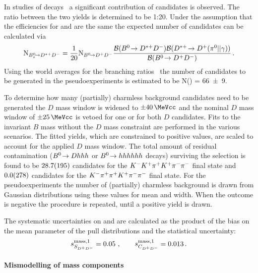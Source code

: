 In studies of \BdToDstD decays~\cite{BToDstDthesis} a significant contribution
of \BsToDstD candidates is observed. The ratio between the two yields is
determined to be 1:20. Under the assumption that the efficiencies for \BToDD
and \BToDstD are the same the expected number of \BsToDstD candidates can be
calculated via
\begin{align}
	\text{N}_{{{B}^0_{s}}\!\rightarrow {\ensuremath{{D}^{*+}}}{\ensuremath{{D}^-}}} = \frac{1}{20} \text{N}_{{{B}^0}\!\rightarrow {\ensuremath{{D}^+}}{\ensuremath{{D}^-}}} \frac{\mathcal{B}({{B}^0}\!\rightarrow {\ensuremath{{D}^{*+}}}{\ensuremath{{D}^-}}) \mathcal{B}({{D}^{*+}} \!\rightarrow {\ensuremath{{D}^+}} ({{\pi}^0} || \gamma))}{\mathcal{B}({{B}^0}\!\rightarrow {\ensuremath{{D}^+}}{\ensuremath{{D}^-}})} \,.
\end{align}
Using the world averages for the branching ratios~\cite{PDG2016} the number of
candidates to be generated in the pseudoexperiments is estimated to be
N(\BsToDstD) = \num{66\pm9}.

To determine how many (partially) charmless background candidates need to be
generated the $D$ mass window is widened to $\SI{\pm40}{\MeVcc}$ and the
nominal $D$ mass window of $\SI{\pm25}{\MeVcc}$ is vetoed for one or for both
$D$ candidates. Fits to the invariant $B$ mass without the $D$ mass constraint
are performed in the various scenarios. %
%
The fitted yields, which are constrained to positive values, are scaled to
account for the applied $D$ mass window. The total amount of residual
contamination (${{B}^0}\!\rightarrow D hhh$ or ${{B}^0}\!\rightarrow hhhhhh$ decays) surviving the
\BdToDD selection is found to be $\num{28.7\pm19.5}$ candidates for the
${{K}^-}{{K}^+}{{\pi}^+}{{K}^+}{{\pi}^-}{{\pi}^-}$ final state and $\num{0.0\pm27.8}$ candidates for the
${{K}^-}{{\pi}^+}{{\pi}^+}{{K}^+}{{\pi}^-}{{\pi}^-}$ final state. For the pseudoexperiments the number of (partially)
charmless background is drawn from Gaussian distributions using these values
for mean and width. When the outcome is negative the procedure is repeated,
until a positive yield is drawn.

The systematic uncertainties on \SDD and \CDD are calculated as the product of
the bias on the mean parameter of the pull distributions and the statistical
uncertainty:
\begin{align*}
s_{S_{{{D}^+}{{D}^-}}}^{\text{mass,1}} = \num{0.05}\ , \qquad s_{C_{{{D}^+}{{D}^-}}}^{\text{mass,1}} = \num{0.013}\,.
\end{align*}

\paragraph{Mismodelling of mass components}

